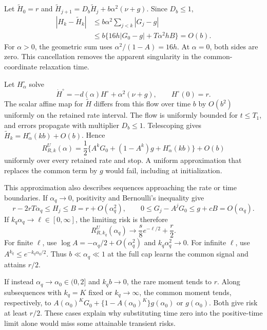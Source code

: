 \documentclass{alt2027}
\begin{document}
Let $\widetilde H_0 = r$ and
$\widetilde H_{j+1} = D_b\widetilde H_j + b\alpha^2(\nu + g)$. Since
$D_b \leq 1$,
\begin{align*}
  |H_k - \widetilde H_k| & \leq b\alpha^2\sum_{j<k}|G_j - g|            \\
                         & \leq b\{16h|G_0 - g| + T\alpha^2hB\} = O(b).
\end{align*}
For $\alpha > 0$, the geometric sum uses $\alpha^2/(1 - A) = 16h$. At
$\alpha = 0$, both sides are zero. This cancellation removes the apparent
singularity in the common-coordinate relaxation time.

Let $H^\circ_\alpha$ solve
\[
  \dot H^\circ = -d(\alpha)H^\circ + \alpha^2(\nu + g), \qquad H^\circ(0) = r.
\]
The scalar affine map for $\widetilde H$ differs from this flow over time $b$ by
$O(b^2)$ uniformly on the retained rate interval. The flow is uniformly bounded
for $t \leq T_1$, and errors propagate with multiplier $D_b \leq 1$. Telescoping
gives $\widetilde H_k = H^\circ_\alpha(kb) + O(b)$. Hence
\begin{equation}
  R^U_{R,k}(\alpha) = \frac12\{A^kG_0 + (1 - A^k)g + H^\circ_\alpha(kb)\}
                      + O(b) \label{eq:limit-u-uniform}
\end{equation}
uniformly over every retained rate and stop. A uniform approximation that
replaces the common term by $g$ would fail, including at initialization.

This approximation also describes sequences approaching the rate or time
boundaries. If $\alpha_q \to 0$, positivity and Bernoulli's inequality give
\[
  r - 2rT\alpha_q \leq H_j
                  \leq B
                  =    r + O(\alpha_q^2),\qquad 0
                  \leq G_j - A^jG_0
                  \leq g + cB
                  =    O(\alpha_q).
\]
If $k_q\alpha_q \to \ell \in[0,\infty]$, the limiting risk is therefore
\begin{equation}
  R^U_{R,k_q}(\alpha_q) \longrightarrow \frac{s}{8}e^{-\ell/2} + \frac r2.
\end{equation}
For finite $\ell$, use $\log A = -\alpha_q/2 + O(\alpha_q^2)$ and
$k_q\alpha_q^2 \to 0$. For infinite $\ell$, use
$A^{k_q} \leq e^{-k_q\alpha_q/2}$. Thus $b \ll \alpha_q \ll 1$ at the full cap
learns the common signal and attains $r/2$.

If instead $\alpha_q \to \alpha_0 \in (0,2]$ and $k_qb \to 0$, the rare moment
tends to $r$. Along subsequences with $k_q = K$ fixed or $k_q \to \infty$, the
common moment tends, respectively, to
$A(\alpha_0)^KG_0 + \{1 - A(\alpha_0)^K\}g(\alpha_0)$ or $g(\alpha_0)$. Both
give risk at least $r/2$. These cases explain why substituting time zero into
the positive-time limit alone would miss some attainable transient risks.
\end{document}
